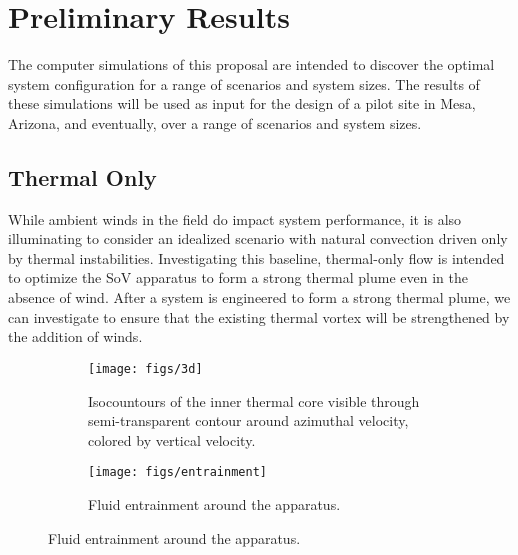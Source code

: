  
\section{Preliminary Results}
\label{sec:results}

The computer simulations of this proposal are intended to discover the
optimal system configuration for a range of scenarios and system
sizes. The results of these simulations will be used as input for the
design of a pilot site in Mesa, Arizona, and eventually, over a range of
scenarios and system sizes. 


\subsection{Thermal Only}

While ambient winds in the field do impact system performance, it is
also illuminating to consider an idealized scenario with natural convection
driven only by thermal instabilities. Investigating this baseline,
thermal-only flow is intended to optimize the SoV apparatus to form a
strong thermal plume even in the absence of wind. After a system is
engineered to form a strong thermal plume, we can investigate to ensure
that the existing thermal vortex will be strengthened by the addition of
winds. 

\begin{figure}[htb]

 \begin{subfigure}{.55\textwidth}
  \centering
  \texttt{[image: figs/3d]}
  \caption{Isocountours of the inner thermal core
  visible through semi-transparent contour around azimuthal velocity,
  colored by vertical velocity. }
  \label{fig:thermal}  
 \end{subfigure}%
 \begin{subfigure}{.4\textwidth}
  \centering
  \texttt{[image: figs/entrainment]}%
  \caption{Fluid entrainment around the apparatus.} 
  \label{fig:entrain}  
 \end{subfigure}%
\end{figure}


